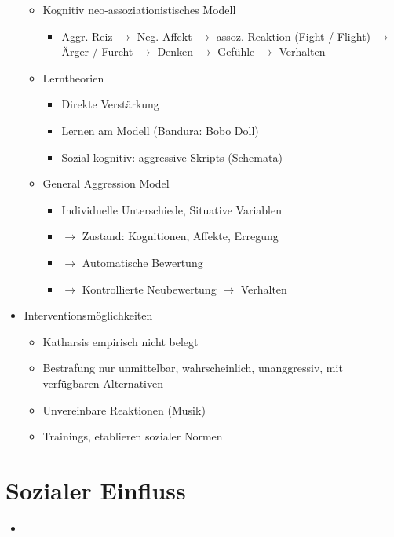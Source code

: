 \documentclass[11pt, paper=a4, twocolumn]{scrartcl}
\begin{document}
\begin{itemize}
\begin{itemize}
\begin{itemize}
						\end{itemize}
					\item Kognitiv neo-assoziationistisches Modell
						\begin{itemize}
							\item Aggr. Reiz $\rightarrow$ Neg. Affekt $\rightarrow$ assoz. Reaktion (Fight / Flight) 
								$\rightarrow$ Ärger / Furcht $\rightarrow$ Denken $\rightarrow$ Gefühle $\rightarrow$ 
								Verhalten
						\end{itemize}
					\item Lerntheorien
						\begin{itemize}
							\item Direkte Verstärkung
							\item Lernen am Modell (Bandura: Bobo Doll)
							\item Sozial kognitiv: aggressive Skripts (Schemata)
						\end{itemize}
					\item General Aggression Model
						\begin{itemize}
							\item Individuelle Unterschiede, Situative Variablen
							\item $\rightarrow$ Zustand: Kognitionen, Affekte, Erregung
							\item $\rightarrow$ Automatische Bewertung
							\item $\rightarrow$ Kontrollierte Neubewertung $\rightarrow$ Verhalten
						\end{itemize}
				\end{itemize}
			\item Interventionsmöglichkeiten
				\begin{itemize}
					\item Katharsis empirisch nicht belegt
					\item Bestrafung nur unmittelbar, wahrscheinlich, unanggressiv, mit verfügbaren Alternativen
					\item Unvereinbare Reaktionen (Musik)
					\item Trainings, etablieren sozialer Normen
				\end{itemize}
		\end{itemize}


	\section{Sozialer Einfluss}
		\begin{itemize}
			\item
		\end{itemize}
\end{document}
